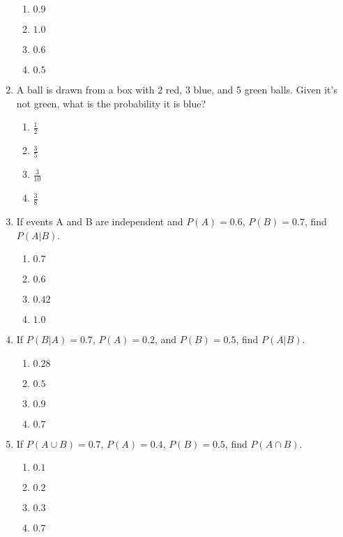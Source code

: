 \begin{enumerate}
\begin{enumerate}[label=(\alph*)]
\item \(0.9\) \quad \item \(1.0\) \quad \item \(0.6\) \quad \item \(0.5\)
\end{enumerate}

\newpage
\item A ball is drawn from a box with 2 red, 3 blue, and 5 green balls. Given it’s not green, what is the probability it is blue?

\begin{enumerate}[label=(\alph*)]
\item \(\frac{1}{2}\) \quad \item \(\frac{3}{5}\) \quad \item \(\frac{3}{10}\) \quad \item \(\frac{3}{8}\)
\end{enumerate}

\item If events A and B are independent and \(P(A) = 0.6\), \(P(B) = 0.7\), find \(P(A|B)\).

\begin{enumerate}[label=(\alph*)]
\item \(0.7\) \quad \item \(0.6\) \quad \item \(0.42\) \quad \item \(1.0\)
\end{enumerate}

\item If \(P(B|A) = 0.7\), \(P(A) = 0.2\), and \(P(B) = 0.5\), find \(P(A|B)\).

\begin{enumerate}[label=(\alph*)]
\item \(0.28\) \quad \item \(0.5\) \quad \item \(0.9\) \quad \item \(0.7\)
\end{enumerate}

\item If \(P(A \cup B) = 0.7\), \(P(A) = 0.4\), \(P(B) = 0.5\), find \(P(A \cap B)\).

\begin{enumerate}[label=(\alph*)]
\item \(0.1\) \quad \item \(0.2\) \quad \item \(0.3\) \quad \item \(0.7\)
\end{enumerate}


\end{enumerate}
